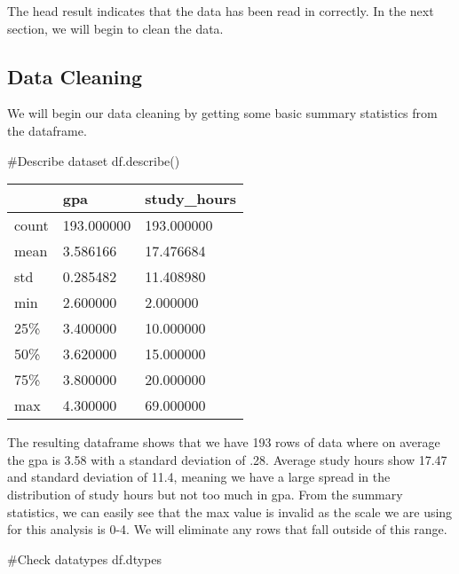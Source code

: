 \documentclass[
  letterpaper,
  DIV=11,
  numbers=noendperiod]{scrreprt}
\newenvironment{Shaded}{\begin{snugshade}}{\end{snugshade}}
\newcommand{\CommentTok}[1]{\textcolor[rgb]{0.37,0.37,0.37}{#1}}
\newcommand{\NormalTok}[1]{\textcolor[rgb]{0.00,0.23,0.31}{#1}}
\begin{document}
The head result indicates that the data has been read in correctly. In
the next section, we will begin to clean the data.

\hypertarget{data-cleaning}{%
\subsection{Data Cleaning}\label{data-cleaning}}

We will begin our data cleaning by getting some basic summary statistics
from the dataframe.

\begin{Shaded}
\begin{Highlighting}[]
\CommentTok{\#Describe dataset}
\NormalTok{df.describe()}
\end{Highlighting}
\end{Shaded}

\begin{longtable}[]{@{}lll@{}}
\toprule\noalign{}
& gpa & study\_hours \\
\midrule\noalign{}
\endhead
\bottomrule\noalign{}
\endlastfoot
count & 193.000000 & 193.000000 \\
mean & 3.586166 & 17.476684 \\
std & 0.285482 & 11.408980 \\
min & 2.600000 & 2.000000 \\
25\% & 3.400000 & 10.000000 \\
50\% & 3.620000 & 15.000000 \\
75\% & 3.800000 & 20.000000 \\
max & 4.300000 & 69.000000 \\
\end{longtable}

The resulting dataframe shows that we have 193 rows of data where on
average the gpa is 3.58 with a standard deviation of .28. Average study
hours show 17.47 and standard deviation of 11.4, meaning we have a large
spread in the distribution of study hours but not too much in gpa. From
the summary statistics, we can easily see that the max value is invalid
as the scale we are using for this analysis is 0-4. We will eliminate
any rows that fall outside of this range.

\begin{Shaded}
\begin{Highlighting}[]
\CommentTok{\#Check datatypes}
\NormalTok{df.dtypes}
\end{Highlighting}
\end{Shaded}
\end{document}
